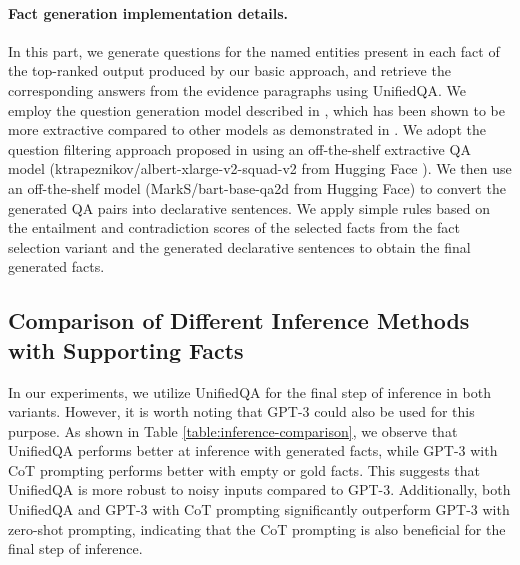 \paragraph{Fact generation implementation details.} In this part, we generate questions for the named entities present in each fact of the top-ranked output produced by our basic approach, and retrieve the corresponding answers from the evidence paragraphs using UnifiedQA. We employ the question generation model described in \citet{deutsch2021towards}, which has been shown to be more extractive compared to other models as demonstrated in \citet{fabbri2021qafacteval}. We adopt the question filtering approach proposed in \citet{honovich2021q2} using an off-the-shelf extractive QA model (ktrapeznikov/albert-xlarge-v2-squad-v2 from Hugging Face \cite{wolf2020transformers}). We then use an off-the-shelf model (MarkS/bart-base-qa2d from Hugging Face) to convert the generated QA pairs into declarative sentences. We apply simple rules based on the entailment and contradiction scores of the selected facts from the fact selection variant and the generated declarative sentences to obtain the final generated facts.

\subsection{Comparison of Different Inference Methods with Supporting Facts}
\label{subsec:inference-comparison}

In our experiments, we utilize UnifiedQA for the final step of inference in both variants. However, it is worth noting that GPT-3 could also be used for this purpose. As shown in Table \ref{table:inference-comparison}, we observe that UnifiedQA performs better at inference with generated facts, while GPT-3 with CoT prompting performs better with empty or gold facts. This suggests that UnifiedQA is more robust to noisy inputs compared to GPT-3. Additionally, both UnifiedQA and GPT-3 with CoT prompting significantly outperform GPT-3 with zero-shot prompting, indicating that the CoT prompting is also beneficial for the final step of inference.



